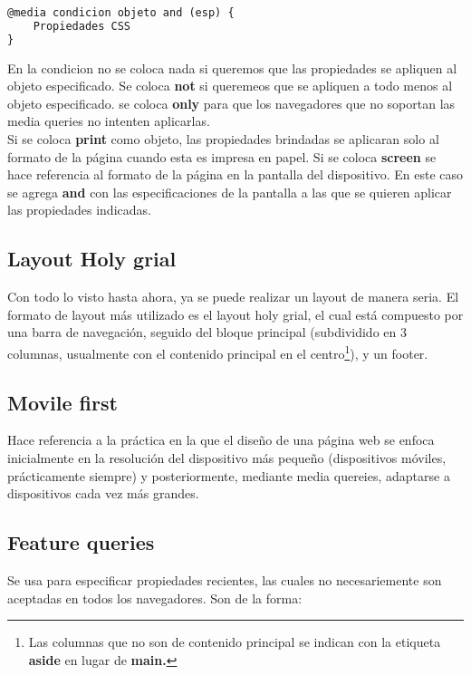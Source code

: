 \documentclass[10pt,oneside]{article}
\begin{document}
\begin{multicols}{2}
    \begin{lstlisting}[language=HTML]
@media condicion objeto and (esp) {
    Propiedades CSS
}      
    \end{lstlisting}

    En la condicion no se coloca nada si queremos que las propiedades se apliquen al objeto especificado. Se coloca \textbf{not} si queremeos que se apliquen a todo menos al objeto especificado. se coloca \textbf{only} para que los navegadores que no soportan las media queries no intenten aplicarlas.\\ \newline Si se coloca \textbf{print} como objeto, las propiedades brindadas se aplicaran solo al formato de la página cuando esta es impresa en papel. Si se coloca \textbf{screen} se hace referencia al formato de la página en la pantalla del dispositivo. En este caso se agrega \textbf{and} con las especificaciones de la pantalla a las que se quieren aplicar las propiedades indicadas.

\subsection{Layout Holy grial}

    Con todo lo visto hasta ahora, ya se puede realizar un layout de manera seria. El formato de layout más utilizado es el layout holy grial, el cual está compuesto por una barra de navegación, seguido del bloque principal (subdividido en 3 columnas, usualmente con el contenido principal en el centro\footnote{Las columnas que no son de contenido principal se indican con la etiqueta \textbf{aside} en lugar de \textbf{main.}}), y un footer. 

\subsection{Movile first}

    Hace referencia a la práctica en la que el diseño de una página web se enfoca inicialmente en la resolución del dispositivo más pequeño (dispositivos móviles, prácticamente siempre) y posteriormente, mediante media quereies, adaptarse a dispositivos cada vez más grandes.

\subsection{Feature queries}

    Se usa para especificar propiedades recientes, las cuales no necesariemente son aceptadas en todos los navegadores. Son de la forma:


\end{multicols}
\end{document}
